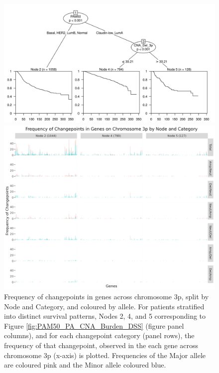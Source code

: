 \begin{figure}[H]
\centering

\includegraphics[width=1\textwidth]{../figures/Chapter_3/PA_Ctree_Survival_Burden_DSS_PAM50.png}

\vspace{0.5cm}

\includegraphics[width = 1\textwidth]{../figures/Chapter_6/Chromosome_3p_Barplot_Node.png}
\caption[Frequency of changepoints in genes across chromosome 3p, split by Node and Category, and coloured by allele.]{Frequency of changepoints in genes across chromosome 3p, split by Node and Category, and coloured by allele. For patients stratified into distinct survival patterns, Nodes 2, 4, and 5 corresponding to Figure \ref{fig:PAM50_PA_CNA_Burden_DSS} (figure panel columns), and for each changepoint category (panel rows), the frequency of that changepoint, observed in the each gene across chromosome 3p (x-axis) is plotted. Frequencies of the Major allele are coloured pink and the Minor allele coloured blue.}
\label{fig:Barplot_3p}
\end{figure}

